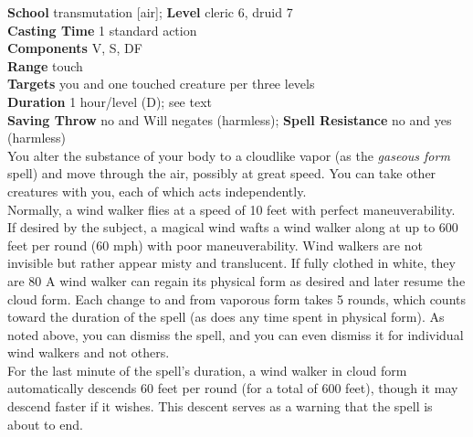 \textbf{School} transmutation [air]; \textbf{Level} cleric 6, druid 7\\
\textbf{Casting Time} 1 standard action\\
\textbf{Components} V, S, DF\\
\textbf{Range} touch\\
\textbf{Targets} you and one touched creature per three levels\\
\textbf{Duration} 1 hour/level (D); see text\\
\textbf{Saving Throw} no and Will negates (harmless); \textbf{Spell Resistance} no and yes (harmless)\\
You alter the substance of your body to a cloudlike vapor (as the \textit{gaseous form }spell) and move through the air, possibly at great speed. You can take other creatures with you, each of which acts independently.\\
Normally, a wind walker flies at a speed of 10 feet with perfect maneuverability. If desired by the subject, a magical wind wafts a wind walker along at up to 600 feet per round (60 mph) with poor maneuverability. Wind walkers are not invisible but rather appear misty and translucent. If fully clothed in white, they are 80%
A wind walker can regain its physical form as desired and later resume the cloud form. Each change to and from vaporous form takes 5 rounds, which counts toward the duration of the spell (as does any time spent in physical form). As noted above, you can dismiss the spell, and you can even dismiss it for individual wind walkers and not others.\\
For the last minute of the spell's duration, a wind walker in cloud form automatically descends 60 feet per round (for a total of 600 feet), though it may descend faster if it wishes. This descent serves as a warning that the spell is about to end.\\
